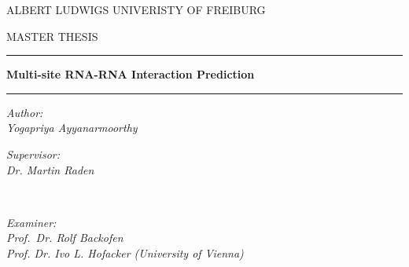  
 \begin{titlepage}
 	\begin{center}
 		
 		
 		{\scshape\Large ALBERT LUDWIGS UNIVERISTY OF FREIBURG \par}\vspace{0.8cm} %
 		\textsc{\Large MASTER THESIS} %
 		
 		\vspace{0.5cm}
 		
 		\hrule  %
 			\vspace{0.4cm}
 		{\huge \bfseries  Multi-site RNA-RNA Interaction Prediction \par}
 		
 		\vspace{0.4cm} %
 		\hrule  %
 		
 	\vspace{0.9cm}
 		
 		\begin{minipage}[t]{0.4\textwidth}
 			\begin{flushleft} \large
 				\emph{Author:}\\
 				\textit{Yogapriya Ayyanarmoorthy}  %
 			\end{flushleft}
 		\end{minipage}
 		\begin{minipage}[t]{0.4\textwidth}
 			\begin{flushright} \large
 				\emph{Supervisor:} \\
 				\textit{Dr. Martin Raden}
 			\end{flushright}
 		\end{minipage}\\[1cm]
 	\begin{minipage}[t]{0.4\textwidth}
 		\begin{center} \large
 			\emph{Examiner:} \\
 			\textit{Prof.~Dr. Rolf Backofen}\\
 			\textit{Prof. Dr. Ivo L. Hofacker (University of Vienna)}
 		\end{center}
 	\end{minipage}%
 	

\end{center}
\end{titlepage}
